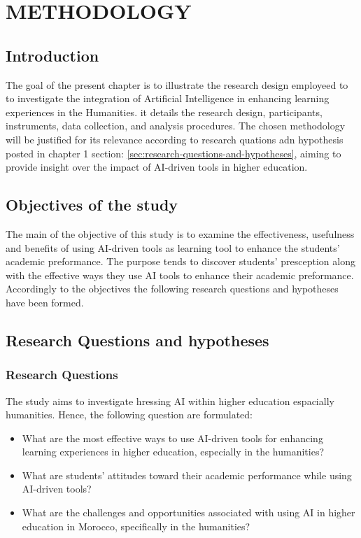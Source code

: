 \chapter{METHODOLOGY}
\section{Introduction}
The goal of the present chapter is to illustrate the research design
employeed to to investigate the integration of Artificial Intelligence
in enhancing learning experiences in the Humanities. it details
the research design, participants, instruments, data collection, and
analysis procedures. The chosen methodology will be justified for its
relevance according to research quations adn hypothesis posted in chapter 1 
section: \ref{sec:research-questions-and-hypotheses}, aiming to provide insight
over the impact of AI-driven tools in higher education.
\section{Objectives of the study}
The main of the objective of this study is to examine the effectiveness, usefulness and
benefits of using AI-driven tools as learning tool to enhance the students' academic preformance.
The purpose tends to discover students' presception along with the effective ways they use AI tools
to enhance their academic preformance. Accordingly to the objectives the following research questions
and hypotheses have been formed.
\section{Research Questions and hypotheses}
\subsection{Research Questions}
The study aims to investigate hressing AI within higher education espacially humanities. Hence,
the following question are formulated:
\begin{itemize}
	\item What are the most effective ways to use AI-driven
	      tools for enhancing learning experiences in higher education,
	      especially in the humanities?
	\item What are students’ attitudes toward their academic performance
	      while using AI-driven tools?
	\item What are the challenges and opportunities associated
	      with using AI in higher education in Morocco,
	      specifically in the humanities?
\end{itemize}

